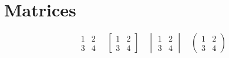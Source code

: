 \documentclass[12pt,a4paper]{article}
\begin{document}
	\section{Matrices}
	\[
		\begin{matrix}
			1&2\\
			3&4
		\end{matrix}
		\quad
		\begin{bmatrix}
			1&2\\
			3&4
		\end{bmatrix}
		\quad
		\begin{vmatrix}
			1&2\\
			3&4
		\end{vmatrix}
		\quad
		\begin{pmatrix}
			1&2\\
			3&4
		\end{pmatrix}	
	\]
\end{document}
